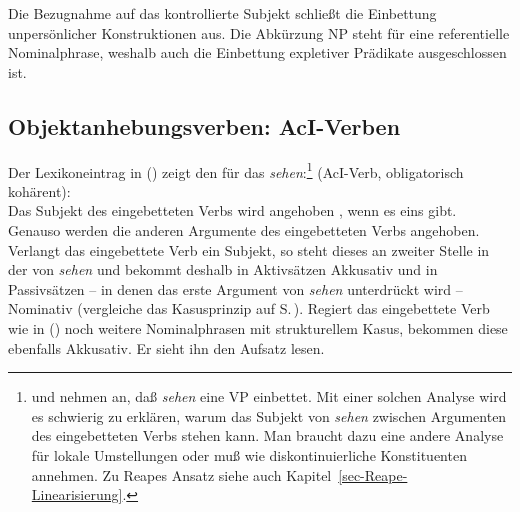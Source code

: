 {Die Bezugnahme auf das kontrollierte Subjekt schließt die Einbettung unpersönlicher Konstruktionen aus.
Die Abkürzung NP steht für eine referentielle Nominalphrase, weshalb auch die Einbettung
expletiver Prädikate ausgeschlossen ist.





\subsection{Objektanhebungsverben: AcI-Verben}
%



Der Lexikoneintrag in () zeigt den \localw für das \aciv \emph{sehen}:\footnote{
        \citet[]{HM94a} und \citet[]{Suchsland97a} nehmen an,
        daß \emph{sehen} eine VP einbettet. Mit einer solchen Analyse wird
        es schwierig zu erklären, warum das Subjekt von \emph{sehen} zwischen
        Argumenten des eingebetteten Verbs stehen kann. Man braucht
        dazu eine andere Analyse für lokale Umstellungen
        oder muß wie \citet{Reape94a} diskontinuierliche Konstituenten
        annehmen. Zu Reapes Ansatz siehe auch Kapitel~\ref{sec-Reape-Linearisierung}.%
}
\eas
\label{le-sehen}
 (AcI-Verb, obligatorisch kohärent):\\
\zs{}
Das Subjekt des eingebetteten Verbs wird angehoben , wenn es eins gibt.
Genauso werden die anderen Argumente des eingebetteten Verbs  angehoben.
Verlangt das eingebettete Verb ein Subjekt, so steht dieses an zweiter Stelle in
der \compsl von \emph{sehen} und bekommt deshalb in Aktivsätzen
Akkusativ und in Passivsätzen -- in denen das erste Argument von \emph{sehen} unterdrückt wird -- 
Nominativ (vergleiche das Kasusprinzip auf S.\,\pageref{case-p}). 
Regiert das eingebettete Verb wie in () noch weitere Nominalphrasen mit strukturellem Kasus, bekommen
diese ebenfalls Akkusativ.
\ea
Er sieht ihn den Aufsatz lesen.
\z

}
